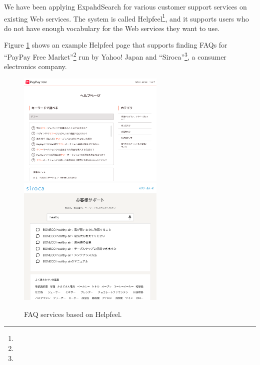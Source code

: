 \documentclass[manuscript,anonymous,review]{acmart}
\def\HF{\textsf{Helpfeel}}
\begin{document}
We have been applying ExpahdSearch for various customer support services on existing Web services.
The system is called {\HF}\footnote{
}, and
it supports users who do not have enough vocabulary for the Web services they want to use.


Figure \ref{paypayhf} shows an example {\HF} page that supports finding FAQs
for ``PayPay Free Market''\footnote{
} run by Yahoo! Japan and ``Siroca''\footnote{
}, a consumer electronics company.


\begin{figure}[H]
  \centering
  \includegraphics[width=7cm,bb=-200 0 1400 1400]{figures/a0ba0873eeada33fad1bc383598f90c1.png}
  \includegraphics[width=7cm,bb=-200 0 1200 1300]{figures/6b491f2701af7193030e332686733568.png}
  \caption{FAQ services based on Helpfeel.} 
  \label{paypayhf}
\end{figure}
\end{document}
